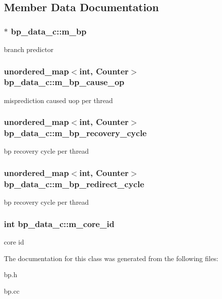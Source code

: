 \subsection{Member Data Documentation}
\hypertarget{classbp__data__c_a27fc83640fcf6d11495cc0a4ff1d8948}{
\subsubsection[{m\_\-bp}]{$\ast$ {\bf bp\_\-data\_\-c::m\_\-bp}}}
\label{classbp__data__c_a27fc83640fcf6d11495cc0a4ff1d8948}
branch predictor \hypertarget{classbp__data__c_a2376a20b3a8eafd087e3b583e865ef7c}{
\subsubsection[{m\_\-bp\_\-cause\_\-op}]{\setlength{\rightskip}{0pt plus 5cm}unordered\_\-map$<$int, Counter$>$ {\bf bp\_\-data\_\-c::m\_\-bp\_\-cause\_\-op}}}
\label{classbp__data__c_a2376a20b3a8eafd087e3b583e865ef7c}
misprediction caused uop per thread \hypertarget{classbp__data__c_ac9932b450b446cd38c5d78f121fe0680}{
\subsubsection[{m\_\-bp\_\-recovery\_\-cycle}]{\setlength{\rightskip}{0pt plus 5cm}unordered\_\-map$<$int, Counter$>$ {\bf bp\_\-data\_\-c::m\_\-bp\_\-recovery\_\-cycle}}}
\label{classbp__data__c_ac9932b450b446cd38c5d78f121fe0680}
bp recovery cycle per thread \hypertarget{classbp__data__c_a1a44ec299d20a6462f0b7d19e953b2bb}{
\subsubsection[{m\_\-bp\_\-redirect\_\-cycle}]{\setlength{\rightskip}{0pt plus 5cm}unordered\_\-map$<$int, Counter$>$ {\bf bp\_\-data\_\-c::m\_\-bp\_\-redirect\_\-cycle}}}
\label{classbp__data__c_a1a44ec299d20a6462f0b7d19e953b2bb}
bp recovery cycle per thread \hypertarget{classbp__data__c_aec4f8430aef4c0bcd64ce66d102babd4}{
\subsubsection[{m\_\-core\_\-id}]{\setlength{\rightskip}{0pt plus 5cm}int {\bf bp\_\-data\_\-c::m\_\-core\_\-id}}}
\label{classbp__data__c_aec4f8430aef4c0bcd64ce66d102babd4}
core id 

The documentation for this class was generated from the following files:\begin{DoxyCompactItemize}
\item 
bp.h\item 
bp.cc\end{DoxyCompactItemize}
